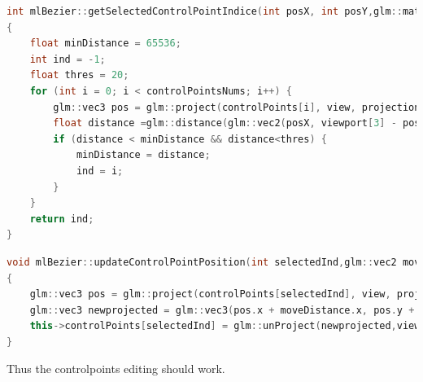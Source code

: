\documentclass[acmtog]{acmart}
\begin{document}
\begin{lstlisting}[frame=single,breaklines=true,language=c++,basicstyle=\footnotesize\ttfamily]
int mlBezier::getSelectedControlPointIndice(int posX, int posY,glm::mat4 view,glm::mat4 projection,glm::vec4 viewport)
{
	float minDistance = 65536;
	int ind = -1;
	float thres = 20;
	for (int i = 0; i < controlPointsNums; i++) {
		glm::vec3 pos = glm::project(controlPoints[i], view, projection, viewport);
		float distance =glm::distance(glm::vec2(posX, viewport[3] - posY), glm::vec2(pos.x,pos.y));
		if (distance < minDistance && distance<thres) {
			minDistance = distance;
			ind = i;
		}
	}
	return ind;
}
\end{lstlisting}
\begin{lstlisting}[frame=single,breaklines=true,language=c++,basicstyle=\footnotesize\ttfamily]
void mlBezier::updateControlPointPosition(int selectedInd,glm::vec2 moveDistance,glm::mat4 view, glm::mat4 projection, glm::vec4 viewport)
{
	glm::vec3 pos = glm::project(controlPoints[selectedInd], view, projection, viewport);
	glm::vec3 newprojected = glm::vec3(pos.x + moveDistance.x, pos.y + moveDistance.y, pos.z);
	this->controlPoints[selectedInd] = glm::unProject(newprojected,view, projection, viewport);
} 
\end{lstlisting}
Thus the controlpoints editing should work.
\end{document}
